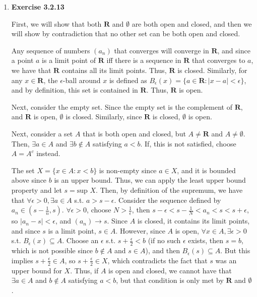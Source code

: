 \documentclass{article}
\begin{document}
\begin{enumerate}
     \item \textbf{Exercise 3.2.13}

     First, we will show that both $\mathbf{R}$ and $\emptyset$ are both open and closed, and then we will show by contradiction that no other set can be both open and closed. 

     \smallskip

     Any sequence of numbers $(a_n)$ that converges will converge in $\mathbf{R}$, and since a point $a$ is a limit point of $\mathbf{R}$ iff there is a sequence in $\mathbf{R}$ that converges to $a$, we have that $\mathbf{R}$ contains all its limit points. Thus, $\mathbf{R}$ is closed. Similarly, for any $x \in \mathbf{R}$, the $\epsilon$-ball around $x$ is defined as $B_\epsilon(x) = \{a \in \mathbf{R} : |x - a| < \epsilon\}$, and by definition, this set is contained in $\mathbf{R}$. Thus, $\mathbf{R}$ is open. 

     \smallskip

     Next, consider the empty set. Since the empty set is the complement of $\mathbf{R}$, and $\mathbf{R}$ is open, $\emptyset$ is closed. Similarly, since $\mathbf{R}$ is closed, $\emptyset$ is open. 

     \smallskip

     Next, consider a set $A$ that is both open and closed, but $A \neq \mathbf{R}$ and $A \neq \emptyset$. Then, $\exists a \in A$ and $\exists b \notin A$ satisfying $a < b$. If, this is not satisfied, choose $A = A^c$ instead. 

     \smallskip

     The set $X = \{x \in A : x < b\}$ is non-empty since $a \in X$, and it is bounded above since $b$ is an upper bound. Thus, we can apply the least upper bound property and let $s = \text{sup }X$. Then, by definition of the supremum, we have that $\forall \epsilon > 0, \exists a \in A$ s.t. $a > s - \epsilon$. Consider the sequence defined by $a_n \in (s - \frac{1}{n}, s)$. $\forall \epsilon > 0$, choose $N > \frac{1}{\epsilon}$, then $s - \epsilon < s - \frac{1}{N} < a_n < s < s + \epsilon$, so $|a_n - s| < \epsilon$, and $(a_n) \rightarrow s$. Since $A$ is closed, it contains its limit points, and since $s$ is a limit point, $s \in A$. However, since $A$ is open, $\forall x \in A, \exists \epsilon > 0$ s.t. $B_\epsilon(x) \subseteq A$. Choose an $\epsilon$ s.t. $s + \frac{\epsilon}{2} < b$ (if no such $\epsilon$ exists, then $s = b$, which is not possible since $b \notin A$ and $s \in A$), and then $B_\epsilon(s) \subseteq A$. But this implies $s + \frac{\epsilon}{2} \in A$, so $s + \frac{\epsilon}{2} \in X$, which contradicts the fact that $s$ was an upper bound for $X$. Thus, if $A$ is open and closed, we cannot have that $\exists a \in A$ and $b \notin A$ satisfying $a < b$, but that condition is only met by $\mathbf{R}$ and $\emptyset$.


\end{enumerate}
\end{document}
